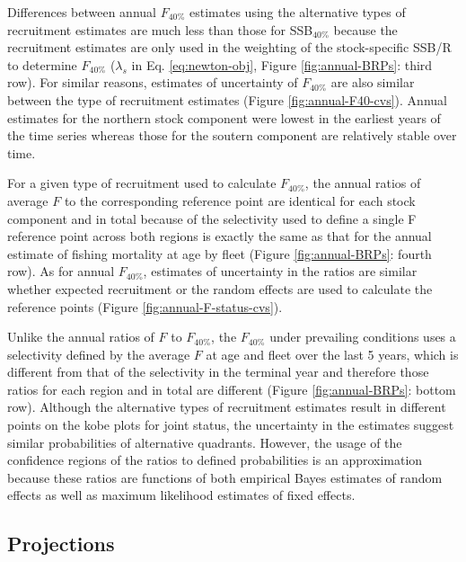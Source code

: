 \documentclass[
]{article}
\begin{document}
Differences between annual \(F_{40\%}\) estimates using the alternative
types of recruitment estimates are much less than those for
SSB\(_{40\%}\) because the recruitment estimates are only used in the
weighting of the stock-specific SSB/R to determine \(F_{40\%}\)
(\(\lambda_s\) in Eq. \ref{eq:newton-obj}, Figure \ref{fig:annual-BRPs}:
third row). For similar reasons, estimates of uncertainty of
\(F_{40\%}\) are also similar between the type of recruitment estimates
(Figure \ref{fig:annual-F40-cvs}). Annual estimates for the northern
stock component were lowest in the earliest years of the time series
whereas those for the soutern component are relatively stable over time.

For a given type of recruitment used to calculate \(F_{40\%}\), the
annual ratios of average \(F\) to the corresponding reference point are
identical for each stock component and in total because of the
selectivity used to define a single F reference point across both
regions is exactly the same as that for the annual estimate of fishing
mortality at age by fleet (Figure \ref{fig:annual-BRPs}: fourth row). As
for annual \(F_{40\%}\), estimates of uncertainty in the ratios are
similar whether expected recruitment or the random effects are used to
calculate the reference points (Figure \ref{fig:annual-F-status-cvs}).

Unlike the annual ratios of \(F\) to \(F_{40\%}\), the \(F_{40\%}\)
under prevailing conditions uses a selectivity defined by the average
\(F\) at age and fleet over the last 5 years, which is different from
that of the selectivity in the terminal year and therefore those ratios
for each region and in total are different (Figure
\ref{fig:annual-BRPs}: bottom row). Although the alternative types of
recruitment estimates result in different points on the kobe plots for
joint status, the uncertainty in the estimates suggest similar
probabilities of alternative quadrants. However, the usage of the
confidence regions of the ratios to defined probabilities is an
approximation because these ratios are functions of both empirical Bayes
estimates of random effects as well as maximum likelihood estimates of
fixed effects.

\hypertarget{projections-1}{%
\subsection*{Projections}\label{projections-1}}
\end{document}
